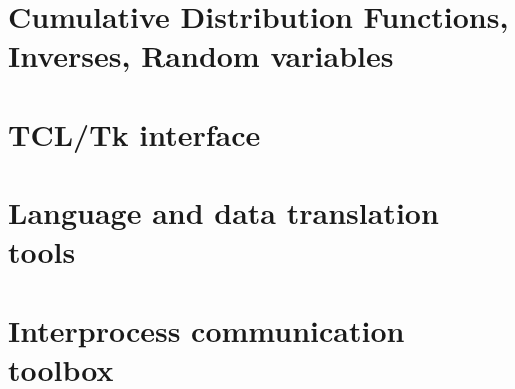 \section{Cumulative Distribution Functions, Inverses, Random
        variables}
        
\section{TCL/Tk interface}
        
\section{Language and data translation tools}
        
\section{Interprocess communication toolbox}
        
